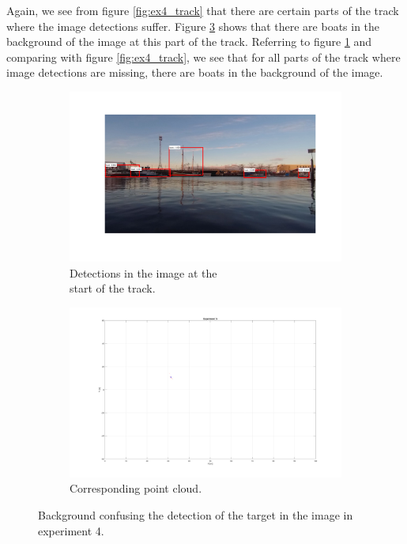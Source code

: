 Again, we see from figure \ref{fig:ex4_track} that there are certain parts of the track where the image detections suffer. Figure \ref{fig:issues_ex4} shows that there are boats in the background of the image at this part of the track. Referring to figure \ref{fig:sub_ex4_issue} and comparing with figure \ref{fig:ex4_track}, we see that for all parts of the track where image detections are missing, there are boats in the background of the image.
\begin{figure}[H]
	\centering
	\begin{subfigure}[t]{.5\linewidth}
		\centering
		\includegraphics[width=\linewidth]{fig/ex4_miss.png}
		\caption{Detections in the image at the\\ start of the track.}
		\label{fig:sub_ex4_issue}
	\end{subfigure}%
	\begin{subfigure}[t]{.5\linewidth}
		\centering
		\includegraphics[width=\linewidth]{fig/ex4_miss_pc.png}
		\caption{Corresponding point cloud.}
		\label{fig:sub_ex4_issue2}
	\end{subfigure}
	\caption{Background confusing the detection of the target in the image in experiment 4.}
	\label{fig:issues_ex4}
\end{figure}
